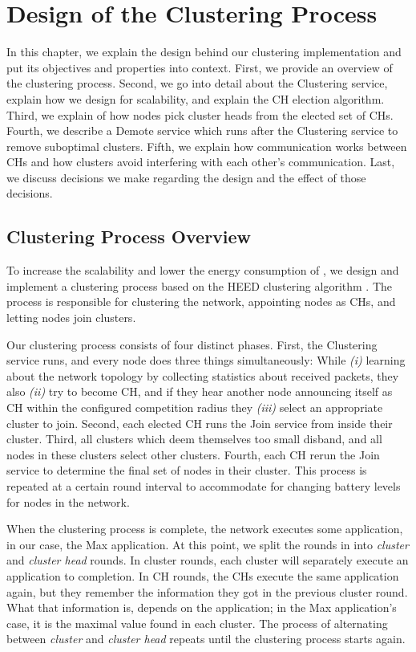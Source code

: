 \chapter{Design of the Clustering Process}
\label{chap:design}
In this chapter, we explain the design behind our clustering implementation and put its objectives and properties into context. First, we provide an overview of the clustering process. Second, we go into detail about the Clustering service, explain how we design for scalability, and explain the CH election algorithm. Third, we explain of how nodes pick cluster heads from the elected set of CHs. Fourth, we describe a Demote service which runs after the Clustering service to remove suboptimal clusters. Fifth, we explain how communication works between CHs and how clusters avoid interfering with each other's communication. Last, we discuss decisions we make regarding the design and the effect of those decisions.

\section{Clustering Process Overview}
To increase the scalability and lower the energy consumption of \atwo{}, we design and implement a clustering process based on the HEED clustering algorithm \cite{Younis2004-HEED}. The process is responsible for clustering the network, appointing nodes as CHs, and letting nodes join clusters.

Our clustering process consists of four distinct phases. First, the Clustering service runs, and every node does three things simultaneously: While \textit{(i)} learning about the network topology by collecting statistics about received packets, they also \textit{(ii)} try to become CH, and if they hear another node announcing itself as CH within the configured competition radius they \textit{(iii)} select an appropriate cluster to join. Second, each elected CH runs the Join service from \atwo{} inside their cluster. Third, all clusters which deem themselves too small disband, and all nodes in these clusters select other clusters. Fourth, each CH rerun the Join service to determine the final set of nodes in their cluster. This process is repeated at a certain round interval to accommodate for changing battery levels for nodes in the network.

When the clustering process is complete, the network executes some application, in our case, the Max application. At this point, we split the rounds in \atwo{} into \emph{cluster} and \emph{cluster head} rounds. In cluster rounds, each cluster will separately execute an application to completion. In CH rounds, the CHs execute the same application again, but they remember the information they got in the previous cluster round. What that information is, depends on the application; in the Max application's case, it is the maximal value found in each cluster.
The process of alternating between \emph{cluster} and \emph{cluster head} repeats until the clustering process starts again.

